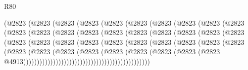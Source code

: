 \begin{lexlean}{R80}
\begin{coremodule}
                    (@2823
                      (@2823
                        (@2823
                          (@2823
                            (@2823
                              (@2823
                                (@2823
                                  (@2823
                                    (@2823
                                      (@2823
                                        (@2823
                                          (@2823
                                            (@2823
                                              (@2823
                                                (@2823
                                                  (@2823
                                                    (@2823
                                                      (@2823
                                                        (@2823
                                                          (@2823
                                                            (@2823
                                                              (@2823
                                                                (@2823
                                                                  (@2823
                                                                    (@2823
                                                                      (@2823
                                                                        (@2823
                                                                          (@2823
                                                                            (@2823
                                                                              (@2823
                                                                                (@2823
                                                                                  (@2823
                                                                                    (@2823
                                                                                      (@2823
                                                                                        (@2823
                                                                                          (@2823
                                                                                            (@2823
                                                                                              (@2823
                                                                                                (@2823
                                                                                                  @4913)))))))))))))))))))))))))))))))))))))))))))))))

\end{coremodule}
\end{lexlean}

